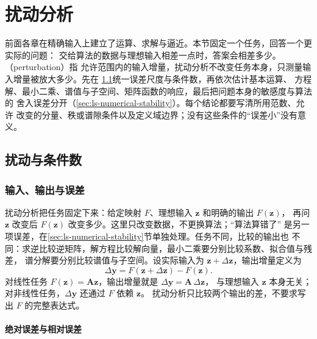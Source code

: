 \section{扰动分析}
\label{sec:ls-perturbation}
\label{sec:linear-algebra-stability}
\label{sec:matrix-analysis-conditioning-perturbation}

前面各章在精确输入上建立了运算、求解与逼近。本节固定一个任务，回答一个更实际的问题：
交给算法的数据与理想输入相差一点时，答案会相差多少。（perturbation）指
允许范围内的输入增量，扰动分析不改变任务本身，只测量输入增量被放大多少。先在
\ref{sec:ls-perturbation-conditioning}统一误差尺度与条件数，再依次估计基本运算、
方程解、最小二乘、谱值与子空间、矩阵函数的响应，最后把问题本身的敏感度与算法的
舍入误差分开（\ref{sec:ls-numerical-stability}）。每个结论都要写清所用范数、允许
改变的分量、秩或谱隙条件以及定义域边界；没有这些条件的“误差小”没有意义。

\subsection{扰动与条件数}
\label{sec:ls-perturbation-conditioning}

\subsubsection{输入、输出与误差}

扰动分析把任务固定下来：给定映射 $F$、理想输入 $\bm z$ 和明确的输出 $F(\bm z)$，
再问 $\bm z$ 改变后 $F(\bm z)$ 改变多少。这里只改变数据，不更换算法；“算法算错了”
是另一项误差，在\ref{sec:ls-numerical-stability}节单独处理。任务不同，比较的输出也
不同：求逆比较逆矩阵，解方程比较解向量，最小二乘要分别比较系数、拟合值与残差，
谱分解要分别比较谱值与子空间。设实际输入为 $\bm z+\Delta\bm z$，输出增量定义为
\[
 \Delta\bm y=F(\bm z+\Delta\bm z)-F(\bm z).
\]
对线性任务 $F(\bm z)=\bm A\bm z$，输出增量就是 $\Delta\bm y=\bm A\,\Delta\bm z$，
与理想输入 $\bm z$ 本身无关；对非线性任务，$\Delta\bm y$ 还通过 $F$ 依赖 $\bm z$。
扰动分析只比较两个输出的差，不要求写出 $F$ 的完整表达式。

\paragraph{绝对误差与相对误差}

